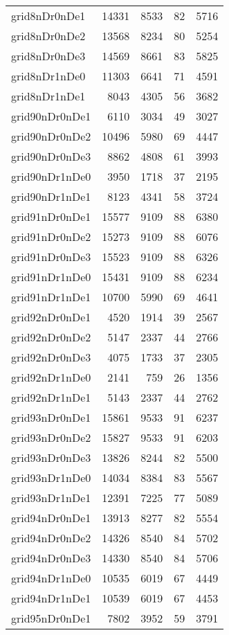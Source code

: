 \begin{longtable}{lrrrr}
grid8nDr0nDe1 & 14331 & 8533 & 82 & 5716 \\
grid8nDr0nDe2 & 13568 & 8234 & 80 & 5254 \\
grid8nDr0nDe3 & 14569 & 8661 & 83 & 5825 \\
grid8nDr1nDe0 & 11303 & 6641 & 71 & 4591 \\
grid8nDr1nDe1 & 8043 & 4305 & 56 & 3682 \\
grid90nDr0nDe1 & 6110 & 3034 & 49 & 3027 \\
grid90nDr0nDe2 & 10496 & 5980 & 69 & 4447 \\
grid90nDr0nDe3 & 8862 & 4808 & 61 & 3993 \\
grid90nDr1nDe0 & 3950 & 1718 & 37 & 2195 \\
grid90nDr1nDe1 & 8123 & 4341 & 58 & 3724 \\
grid91nDr0nDe1 & 15577 & 9109 & 88 & 6380 \\
grid91nDr0nDe2 & 15273 & 9109 & 88 & 6076 \\
grid91nDr0nDe3 & 15523 & 9109 & 88 & 6326 \\
grid91nDr1nDe0 & 15431 & 9109 & 88 & 6234 \\
grid91nDr1nDe1 & 10700 & 5990 & 69 & 4641 \\
grid92nDr0nDe1 & 4520 & 1914 & 39 & 2567 \\
grid92nDr0nDe2 & 5147 & 2337 & 44 & 2766 \\
grid92nDr0nDe3 & 4075 & 1733 & 37 & 2305 \\
grid92nDr1nDe0 & 2141 & 759 & 26 & 1356 \\
grid92nDr1nDe1 & 5143 & 2337 & 44 & 2762 \\
grid93nDr0nDe1 & 15861 & 9533 & 91 & 6237 \\
grid93nDr0nDe2 & 15827 & 9533 & 91 & 6203 \\
grid93nDr0nDe3 & 13826 & 8244 & 82 & 5500 \\
grid93nDr1nDe0 & 14034 & 8384 & 83 & 5567 \\
grid93nDr1nDe1 & 12391 & 7225 & 77 & 5089 \\
grid94nDr0nDe1 & 13913 & 8277 & 82 & 5554 \\
grid94nDr0nDe2 & 14326 & 8540 & 84 & 5702 \\
grid94nDr0nDe3 & 14330 & 8540 & 84 & 5706 \\
grid94nDr1nDe0 & 10535 & 6019 & 67 & 4449 \\
grid94nDr1nDe1 & 10539 & 6019 & 67 & 4453 \\
grid95nDr0nDe1 & 7802 & 3952 & 59 & 3791 \\

\end{longtable}
